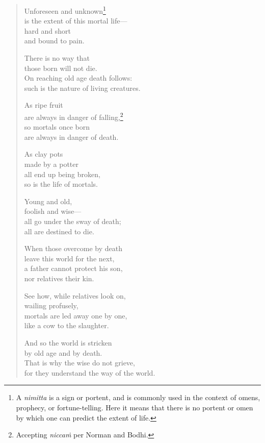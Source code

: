 \documentclass[12pt,openany]{book}%
\begin{document}
\begin{verse}%
Unforeseen and unknown\footnote{A \textit{nimitta} is a sign or portent, and is commonly used in the context of omens, prophecy, or fortune-telling. Here it means that there is no portent or omen by which one can predict the extent of life. } \\
is the extent of this mortal life—\\
hard and short \\
and bound to pain. 

There is no way that \\
those born will not die. \\
On reaching old age death follows: \\
such is the nature of living creatures. 

As ripe fruit \\
are always in danger of falling,\footnote{Accepting \textit{\textsanskrit{niccaṁ}} per Norman and Bodhi. } \\
so mortals once born \\
are always in danger of death. 

As clay pots \\
made by a potter \\
all end up being broken, \\
so is the life of mortals. 

Young and old, \\
foolish and wise—\\
all go under the sway of death; \\
all are destined to die. 

When those overcome by death \\
leave this world for the next, \\
a father cannot protect his son, \\
nor relatives their kin. 

See how, while relatives look on, \\
wailing profusely, \\
mortals are led away one by one, \\
like a cow to the slaughter. 

And so the world is stricken \\
by old age and by death. \\
That is why the wise do not grieve, \\
for they understand the way of the world. 


\end{verse}
\end{document}
